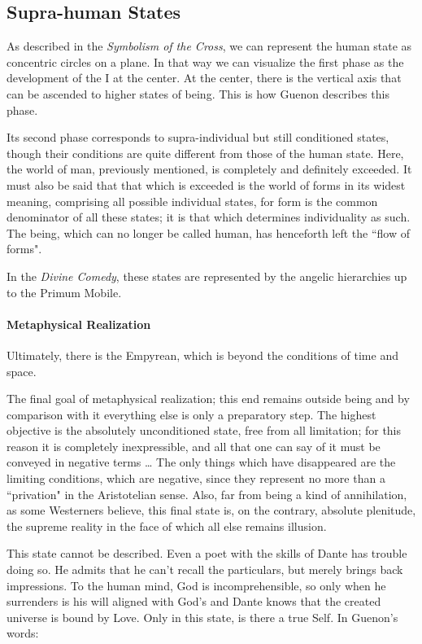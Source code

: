 \subsection*{Supra-human States}
As described in the \emph{Symbolism of the Cross}, we can represent the human state as concentric circles on a plane. In that way we can visualize the first phase as the development of the I at the center. At the center, there is the vertical axis that can be ascended to higher states of being. This is how Guenon describes this phase.

\begin{quotex}
Its second phase corresponds to supra-individual but still conditioned states, though their conditions are quite different from those of the human state. Here, the world of man, previously mentioned, is completely and definitely exceeded. It must also be said that that which is exceeded is the world of forms in its widest meaning, comprising all possible individual states, for form is the common denominator of all these states; it is that which determines individuality as such. The being, which can no longer be called human, has henceforth left the ``flow of forms". 

\end{quotex}
In the \emph{Divine Comedy}, these states are represented by the angelic hierarchies up to the Primum Mobile.

\paragraph{Metaphysical Realization}
Ultimately, there is the Empyrean, which is beyond the conditions of time and space.

\begin{quotex}
The final goal of metaphysical realization; this end remains outside being and by comparison with it everything else is only a preparatory step. The highest objective is the absolutely unconditioned state, free from all limitation; for this reason it is completely inexpressible, and all that one can say of it must be conveyed in negative terms … The only things which have disappeared are the limiting conditions, which are negative, since they represent no more than a ``privation" in the Aristotelian sense. Also, far from being a kind of annihilation, as some Westerners believe, this final state is, on the contrary, absolute plenitude, the supreme reality in the face of which all else remains illusion. 

\end{quotex}
This state cannot be described. Even a poet with the skills of Dante has trouble doing so. He admits that he can't recall the particulars, but merely brings back impressions. To the human mind, God is incomprehensible, so only when he surrenders is his will aligned with God's and Dante knows that the created universe is bound by Love. Only in this state, is there a true Self. In Guenon's words:

